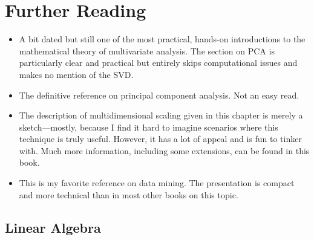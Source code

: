 
\section{Further Reading}

\begin{itemize}
\item {}
  A bit dated but still one of the most practical, hands-on
  introductions to the mathematical theory of multivariate analysis.
  The section on PCA is particularly clear and practical but entirely
  skips computational issues and makes no mention of the SVD.

\item {}
  The definitive reference on principal component analysis. Not an
  easy read.

\item {}
  The description of multidimensional scaling given in this chapter is
  merely a sketch---mostly, because I find it hard to imagine
  scenarios where this technique is truly useful. However, it has a
  lot of appeal and is fun to tinker with. Much more information,
  including some extensions, can be found in this book.

\item {}
  This is my favorite reference on data mining. The presentation is
  compact and more technical than in most other books on this topic.
\end{itemize}


\subsection{Linear Algebra}


